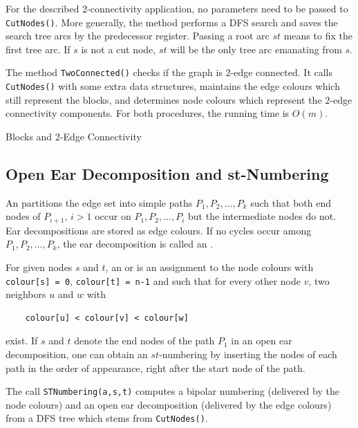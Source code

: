 \documentclass[a4paper,11pt,twoside]{book}
\begin{document}
\begin{multicols}{2}
For the described 2-connectivity application, no parameters need to be passed
to \verb/CutNodes()/. More generally, the method performs a DFS search and
saves the search tree arcs by the predecessor register. Passing a root arc $st$
means to fix the first tree arc. If $s$ is not a cut node, $st$ will be the
only tree arc emanating from $s$.

The method \verb/TwoConnected()/ checks if the graph is $2$-edge connected.
It calls \verb/CutNodes()/ with some extra data structures, maintains the edge
colours which still represent the blocks, and determines node colours which represent
the $2$-edge connectivity components. For both procedures, the running time is
$O(m)$.

\bigskip
\begin{figurehere}
\begin{center}
\epsfxsize=11cm
\vspace{0.5cm}
\caption{\label{flb_connect2}Blocks and 2-Edge Connectivity}
\end{center}
\end{figurehere}


\subsection{Open Ear Decomposition and st-Numbering}
An  partitions the edge set into simple paths
$P_1,P_2,\dots,P_k$ such that both end nodes of $P_{i+1}$, $i>1$ occur on
$P_1,P_2,\dots,P_i$ but the intermediate nodes do not. Ear decompositions are
stored as edge colours. If no cycles occur among $P_1,P_2,\dots,P_k$, the ear
decomposition is called an .

For given nodes $s$ and $t$, an  or 
is an assignment to the node colours with \verb/colour[s] = 0/,
\verb/colour[t] = n-1/ and such that for every other node $v$, two neighbors
$u$ and $w$ with
\begin{verbatim}
    colour[u] < colour[v] < colour[w]
\end{verbatim}
exist. If $s$ and $t$ denote the end nodes of the path $P_1$ in an open ear
decomposition, one can obtain an $st$-numbering by inserting the nodes of each
path in the order of appearance, right after the start node of the path.

The call \verb/STNumbering(a,s,t)/ computes a bipolar numbering (delivered by
the node colours) and an open ear decomposition (delivered by the edge colours)
from a DFS tree which stems from \verb/CutNodes()/.


\end{multicols}
\end{document}
